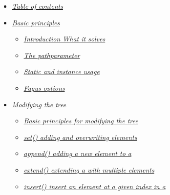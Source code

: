 \documentclass[a4paper,10pt,english]{sphinxmanual}
\begin{document}
\begin{itemize}
\item {}
\sphinxAtStartPar
{\hyperref[\detokenize{README:table-of-contents}]{\emph{Table of contents}}}

\item {}
\sphinxAtStartPar
{\hyperref[\detokenize{README:basic-principles}]{\emph{Basic principles}}}
\begin{itemize}
\item {}
\sphinxAtStartPar
{\hyperref[\detokenize{README:introduction----what-it-solves}]{\emph{Introduction \textendash{} What it solves}}}

\item {}
\sphinxAtStartPar
{\hyperref[\detokenize{README:the-path-parameter}]{\emph{The path\sphinxhyphen{}parameter}}}

\item {}
\sphinxAtStartPar
{\hyperref[\detokenize{README:static-and-instance-usage}]{\emph{Static and instance usage}}}

\item {}
\sphinxAtStartPar
{\hyperref[\detokenize{README:fagus-options}]{\emph{Fagus options}}}

\end{itemize}

\item {}
\sphinxAtStartPar
{\hyperref[\detokenize{README:modifying-the-tree}]{\emph{Modifying the tree}}}
\begin{itemize}
\item {}
\sphinxAtStartPar
{\hyperref[\detokenize{README:basic-principles-for-modifying-the-tree}]{\emph{Basic principles for modifying the tree}}}

\item {}
\sphinxAtStartPar
{\hyperref[\detokenize{README:set----adding-and-overwriting-elements}]{\emph{set() \textendash{} adding and overwriting elements}}}

\item {}
\sphinxAtStartPar
{\hyperref[\detokenize{README:append----adding-a-new-element-to-a-list}]{\emph{append() \textendash{} adding a new element to a }}}

\item {}
\sphinxAtStartPar
{\hyperref[\detokenize{README:extend----extending-a-list-with-multiple-elements}]{\emph{extend() \textendash{} extending a  with multiple elements}}}

\item {}
\sphinxAtStartPar
{\hyperref[\detokenize{README:insert----insert-an-element-at-a-given-index-in-a-list}]{\emph{insert() \textendash{} insert an element at a given index in a }}}


\end{itemize}
\end{itemize}
\end{document}
